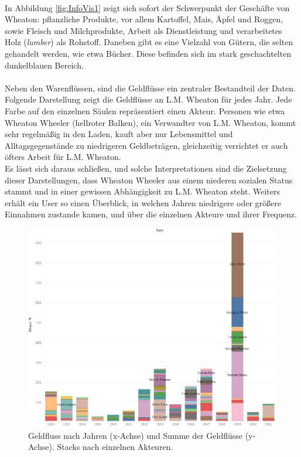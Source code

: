 \documentclass[12pt,a4paper]{article}
\begin{document}
\\
In Abbildung \ref{fig:InfoVis1} zeigt sich sofort der Schwerpunkt der Geschäfte von Wheaton: pflanzliche Produkte, vor allem Kartoffel, Mais, Äpfel und Roggen, sowie Fleisch und Milchprodukte, Arbeit als Dienstleistung und verarbeitetes Holz (\textit{lumber}) als Rohstoff. Daneben gibt es eine Vielzahl von Gütern, die selten gehandelt werden, wie etwa Bücher. Diese befinden sich im stark geschachtelten dunkelblauen Bereich.
\\
\\
Neben den Warenflüssen, sind die Geldflüsse ein zentraler Bestandteil der Daten. Folgende Darstellung zeigt die Geldflüsse an L.M. Wheaton für jedes Jahr. Jede Farbe auf den einzelnen Säulen repräsentiert einen Akteur. Personen wie etwa Wheaton Wheeler (hellroter Balken), ein Verwandter von L.M. Wheaton, kommt sehr regelmäßig in den Laden, kauft aber nur Lebensmittel und Alltagsgegenstände zu niedrigeren Geldbeträgen, gleichzeitig verrichtet er auch öfters Arbeit für L.M. Wheaton.
\\
Es lässt sich daraus schließen, und solche Interpretationen sind die Zielsetzung dieser Darstellungen, dass Wheaton Wheeler aus einem niederen sozialen Status stammt und in einer gewissen Abhängigkeit zu L.M. Wheaton steht. Weiters erhält ein User so einen Überblick, in welchen Jahren niedrigere oder größere Einnahmen zustande kamen, und über die einzelnen Akteure und ihrer Frequenz.
\begin{figure}[H]
\centering
	\includegraphics[width=1\textwidth]{img/infovis2.jpg}  
    \caption[Geldfluss nach Jahren (x-Achse) und Summe der Geldflüsse (y-Achse). Stacks nach einzelnen Akteuren, eigene Darstellung, erstellt mit Tableau Desktop]{Geldfluss nach Jahren (x-Achse) und Summe der Geldflüsse (y-Achse). Stacks nach einzelnen Akteuren.} \label{fig:InfoVis2}
\end{figure}
\end{document}
